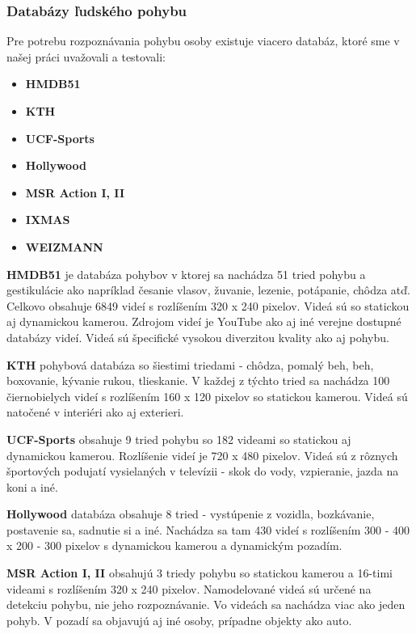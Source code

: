 \subsubsection{Databázy ľudského pohybu}\label{dbludskeho}
Pre potrebu rozpoznávania pohybu osoby existuje viacero databáz, ktoré sme v našej práci uvažovali a testovali:
\begin{itemize}
\item \textbf{HMDB51}
\item \textbf{KTH}
\item \textbf{UCF-Sports}
\item \textbf{Hollywood}
\item \textbf{MSR Action I, II}
\item \textbf{IXMAS}
\item \textbf{WEIZMANN}
\end{itemize}

\textbf{HMDB51} je databáza pohybov v ktorej sa nachádza 51 tried pohybu a gestikulácie ako napríklad česanie vlasov, žuvanie, lezenie, potápanie, chôdza atď. Celkovo obsahuje 6849 videí s rozlíšením 320 x 240 pixelov. Videá sú so statickou aj dynamickou kamerou. Zdrojom videí je YouTube ako aj iné verejne dostupné databázy videí. Videá sú špecifické vysokou diverzitou kvality ako aj pohybu.\cite{c1}

\textbf{KTH} pohybová databáza so šiestimi triedami - chôdza, pomalý beh, beh, boxovanie, kývanie rukou, tlieskanie. V každej z týchto tried sa nachádza 100 čiernobielych videí s rozlíšením 160 x 120 pixelov so statickou kamerou. Videá sú natočené v interiéri ako aj exterieri. \cite{c1}

\textbf{UCF-Sports} obsahuje 9 tried pohybu so 182 videami so statickou aj dynamickou kamerou. Rozlíšenie videí je 720 x 480 pixelov. Videá sú z rôznych športových podujatí vysielaných v televízii - skok do vody, vzpieranie, jazda na koni a iné.\cite{c1} 

\textbf{Hollywood} databáza obsahuje 8 tried - vystúpenie z vozidla, bozkávanie, postavenie sa, sadnutie si a iné. Nachádza sa tam 430 videí s rozlíšením 300 - 400 x 200 - 300 pixelov s dynamickou kamerou a dynamickým pozadím.\cite{c1}

\textbf{MSR Action I, II} obsahujú 3 triedy pohybu so statickou kamerou a 16-timi videami s  rozlíšením 320 x 240 pixelov. Namodelované videá sú určené na detekciu pohybu, nie jeho rozpoznávanie. Vo videách sa nachádza viac ako jeden pohyb. V pozadí sa objavujú aj iné osoby, prípadne objekty ako auto. \cite{c1}

